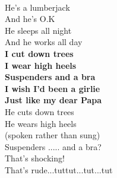 \documentclass[a6paper,10pt]{article}
\begin{document}
\begin{lyrics}
\vspace{5pt}\\ 
He's a lumberjack\\ 
And he's O.K\\ 
He sleeps all night\\ 
And he works all day
\vspace{5pt}\\ 
\textbf{I cut down trees\\ 
I wear high heels\\ 
Suspenders and a bra\\ 
I wish I'd been a girlie\\ 
Just like my dear Papa}
\vspace{5pt}\\ 
He cuts down trees\\ 
He wears high heels\\ 
(spoken rather than sung)\\ 
Suspenders ..... and a bra?\\ 
That's shocking!\\ 
That's rude...tuttut...tut...tut
\end{lyrics}
\end{document}
